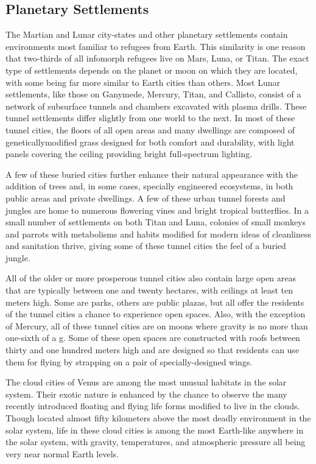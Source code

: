\subsection{Planetary Settlements}

The Martian and Lunar city-states and other planetary settlements contain environments most familiar 
to refugees from Earth. This similarity is one reason 
that two-thirds of all infomorph refugees live on 
Mars, Luna, or Titan. The exact type of settlements 
depends on the planet or moon on which they are 
located, with some being far more similar to Earth 
cities than others. Most Lunar settlements, like those 
on Ganymede, Mercury, Titan, and Callisto, consist 
of a network of subsurface tunnels and chambers excavated with plasma drills. These tunnel settlements 
differ slightly from one world to the next. In most 
of these tunnel cities, the floors of all open areas 
and many dwellings are composed of geneticallymodified grass designed for both comfort and durability, with light panels covering the ceiling providing 
bright full-spectrum lighting.

A few of these buried cities further enhance their 
natural appearance with the addition of trees and, in 
some cases, specially engineered ecosystems, in both 
public areas and private dwellings. A few of these 
urban tunnel forests and jungles are home to numerous flowering vines and bright tropical butterflies. 
In a small number of settlements on both Titan and 
Luna, colonies of small monkeys and parrots with 
metabolisms and habits modified for modern ideas 
of cleanliness and sanitation thrive, giving some of 
these tunnel cities the feel of a buried jungle.

All of the older or more prosperous tunnel cities 
also contain large open areas that are typically between one and twenty hectares, with ceilings at least 
ten meters high. Some are parks, others are public 
plazas, but all offer the residents of the tunnel cities 
a chance to experience open spaces. Also, with the 
exception of Mercury, all of these tunnel cities are on 
moons where gravity is no more than one-sixth of a g. 
Some of these open spaces are constructed with roofs 
between thirty and one hundred meters high and are 
designed so that residents can use them for flying by 
strapping on a pair of specially-designed wings.

The cloud cities of Venus are among the most unusual habitats in the solar system. Their exotic nature 
is enhanced by the chance to observe the many recently introduced floating and flying life forms modified to live in the clouds. Though located almost fifty 
kilometers above the most deadly environment in the 
solar system, life in these cloud cities is among the 
most Earth-like anywhere in the solar system, with 
gravity, temperatures, and atmospheric pressure all 
being very near normal Earth levels.

